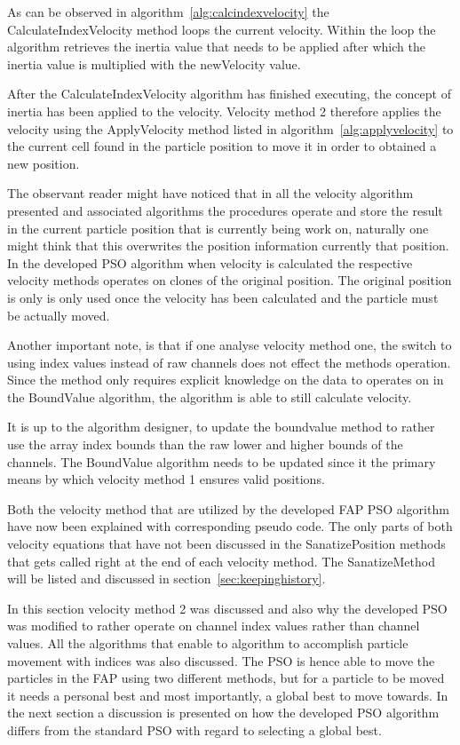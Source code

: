 As can be observed in algorithm~\ref{alg:calcindexvelocity} the CalculateIndexVelocity method loops the current velocity. Within the loop the algorithm retrieves the inertia value that needs to be applied after which the inertia value is multiplied with the newVelocity value.

After the CalculateIndexVelocity algorithm has finished executing, the concept of inertia has been applied to the velocity. Velocity method 2 therefore applies the velocity using the ApplyVelocity method listed in algorithm~\ref{alg:applyvelocity} to the current cell found in the particle position to move it in order to obtained a new position.

The observant reader might have noticed that in all the velocity algorithm presented and associated algorithms the procedures operate and store the result in the current particle position that is currently being work on, naturally one might think that this overwrites the position information currently that position. In the developed PSO algorithm when velocity is calculated the respective velocity methods operates on clones of the original position. The original position is only is only used once the velocity has been calculated and the particle must be actually moved.

Another important note, is that if one analyse velocity method one, the switch to using index values instead of raw channels does not effect the methods operation. Since the method only requires explicit knowledge on the data to operates on in the BoundValue algorithm, the algorithm is able to still calculate velocity. 

It is up to the algorithm designer, to update the boundvalue method to rather use the array index bounds than the raw lower and higher bounds of the channels. The BoundValue algorithm needs to be updated since it the primary means by which velocity method 1 ensures valid positions.

Both the velocity method that are utilized by the developed FAP PSO algorithm have now been explained with corresponding pseudo code. The only parts of both velocity equations that have not been discussed in the SanatizePosition methods that gets called right at the end of each velocity method. The SanatizeMethod will be listed and discussed in section~\ref{sec:keepinghistory}.

In this section velocity method 2 was discussed and also why the developed PSO was modified to rather operate on channel index values rather than channel values. All the algorithms that enable to algorithm to accomplish particle movement with indices was also discussed. The PSO is hence able to move the particles in the FAP using two different methods, but for a particle to be moved it needs a personal best and most importantly, a global best to move towards. In the next section a discussion is presented on how the developed PSO algorithm differs from the standard PSO with regard to selecting a global best.
